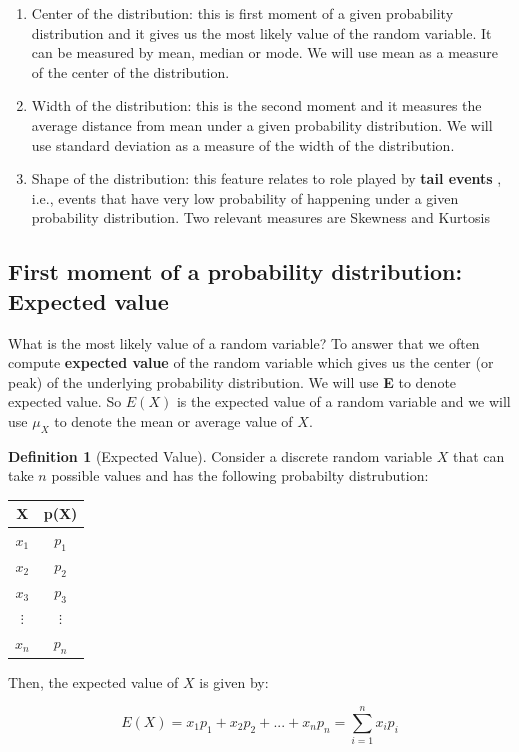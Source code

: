 \documentclass[
]{book}
\theoremstyle{definition}
\newtheorem{definition}{Definition}[chapter]
\theoremstyle{definition}
\theoremstyle{definition}
\theoremstyle{definition}
\theoremstyle{remark}
\begin{document}
\begin{enumerate}
\def\labelenumi{\arabic{enumi}.}
\item
  Center of the distribution: this is first moment of a given probability distribution and it gives us the most likely value of the random variable. It can be measured by mean, median or mode. We will use mean as a measure of the center of the distribution.
\item
  Width of the distribution: this is the second moment and it measures the average distance from mean under a given probability distribution. We will use standard deviation as a measure of the width of the distribution.
\item
  Shape of the distribution: this feature relates to role played by \textbf{tail events} , i.e., events that have very low probability of happening under a given probability distribution. Two relevant measures are Skewness and Kurtosis
\end{enumerate}

\hypertarget{first-moment-of-a-probability-distribution-expected-value}{%
\subsection{First moment of a probability distribution: Expected value}\label{first-moment-of-a-probability-distribution-expected-value}}

What is the most likely value of a random variable? To answer that we often compute \textbf{expected value} of the random variable which gives us the center (or peak) of the underlying probability distribution. We will use \textbf{E} to denote expected value. So \(E(X)\) is the expected value of a random variable and we will use \(\mu_X\) to denote the mean or average value of \(X\).

\begin{definition}[Expected Value]
\protect\hypertarget{def:unnamed-chunk-77}{}\label{def:unnamed-chunk-77}Consider a discrete random variable \(X\) that can take \(n\) possible values and has the following probabilty distrubution:

\begin{longtable}[]{@{}cc@{}}
\toprule\noalign{}
X & p(X) \\
\midrule\noalign{}
\endhead
\bottomrule\noalign{}
\endlastfoot
\(x_1\) & \(p_1\) \\
\(x_2\) & \(p_2\) \\
\(x_3\) & \(p_3\) \\
\(\vdots\) & \(\vdots\) \\
\(x_n\) & \(p_n\) \\
\end{longtable}

Then, the expected value of \(X\) is given by:

\[E(X)= x_1 p_1 + x_2 p_2+...+ x_n p_n = \sum_{i=1}^n x_ip_i\]
\end{definition}
\end{document}
